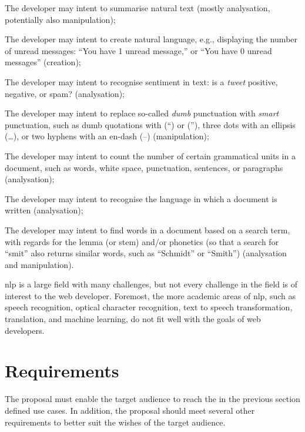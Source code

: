 \begin{aenumerate}
\item\label{list:use-case:1} The developer may intent to summarise natural
  text (mostly analysation, potentially also manipulation);
\item\label{list:use-case:2} The developer may intent to create natural
  language, e.g., displaying the number of unread messages: ``You have 1
  unread message,'' or ``You have 0 unread messages'' (creation);
\item\label{list:use-case:3} The developer may intent to recognise sentiment
  in text: is a \emph{tweet} positive, negative, or spam? (analysation);
\item\label{list:use-case:4} The developer may intent to replace so-called
  \emph{dumb} punctuation with \emph{smart} punctuation, such as dumb
  quotations with (``) or (''), three dots with an ellipsis (\ldots{}), or
  two hyphens with an en-dash (--) (manipulation);
\item\label{list:use-case:5} The developer may intent to count the number of
  certain grammatical units in a document, such as words, white space,
  punctuation, sentences, or paragraphs (analysation);
\item\label{list:use-case:6} The developer may intent to recognise the
  language in which a document is written (analysation);
\item\label{list:use-case:7} The developer may intent to find words in a
  document based on a search term, with regards for the lemma (or stem)
  and\slash or phonetics (so that a search for ``smit'' also returns similar
  words, such as ``Schmidt'' or ``Smith'') (analysation and manipulation).
\end{aenumerate}

\noindent \gls{nlp} is a large field with many challenges, but not every
  challenge in the field is of interest to the web developer.
Foremost, the more academic areas of \gls{nlp}, such as speech recognition,
  optical character recognition, text to speech transformation, translation,
  and machine learning, do not fit well with the goals of web developers.

\section{Requirements}\label{requirements}

The proposal must enable the target audience to reach the in the previous
  section defined use cases.
In addition, the proposal should meet several other requirements to better
  suit the wishes of the target audience.

